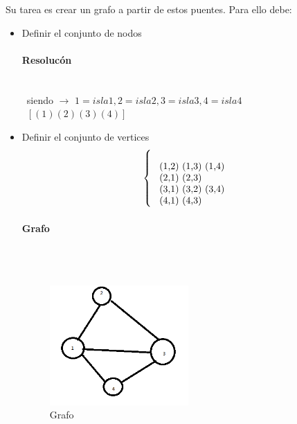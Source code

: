 \documentclass{article}
\begin{document}
Su tarea es crear un grafo a partir de estos puentes. Para ello debe:
\begin{itemize}
        \item{Definir el conjunto de nodos}
        \paragraph{Resoluc\'on}
       \ \\ \ siendo $\rightarrow$ $1 = isla 1, 2 = isla 2, 3 = isla 3, 4 = isla 4$
        \ \\ \ $[(1) (2) (3) (4)]$
        \item{Definir el conjunto de vertices}
        \[
           \left\{
        \begin{array}{l l}
          \ \\ \ $(1,2) (1,3) (1,4)$
       \ \\ \  $(2,1) (2,3)$
       \ \\ \ $(3,1) (3,2) (3,4)$
       \ \\ \ $(4,1) (4,3)$\\
        \end{array}
        \right.
        \]
\paragraph{Grafo}
\ \\ \
  \begin{figure}
	\begin{center}
		\includegraphics[width=0.5\textwidth]{gr.png}
		\caption{Grafo}
	\end{center}
\end{figure}
\ \\ \
\ \\ \
\ \\ \
\ \\ \
\ \\ \
\ \\ \
\ \\ \
\ \\ \


\end{itemize}
\end{document}
